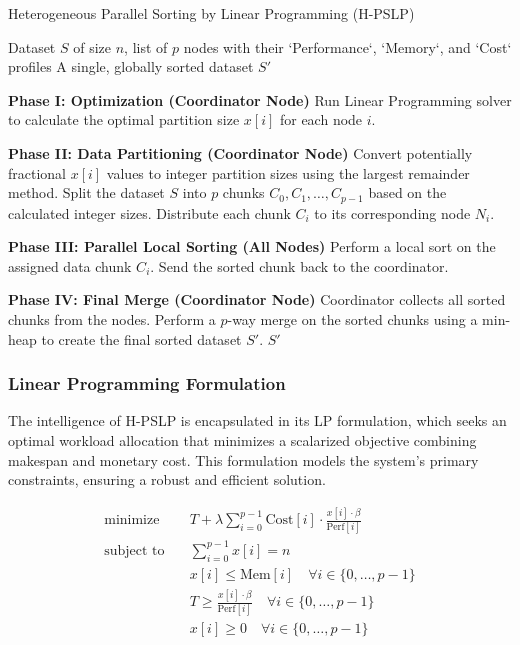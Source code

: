 \documentclass{article}
\begin{document}
\begin{algorithm}[H]
\caption{Heterogeneous Parallel Sorting by Linear Programming (H-PSLP)}
\label{alg:hpslp}
\begin{algorithmic}[1]
\REQUIRE Dataset $S$ of size $n$, list of $p$ nodes with their `Performance`, `Memory`, and `Cost` profiles
\ENSURE A single, globally sorted dataset $S'$

\STATE \textbf{Phase I: Optimization (Coordinator Node)}
\STATE Run Linear Programming solver to calculate the optimal partition size $x[i]$ for each node $i$.

\STATE \textbf{Phase II: Data Partitioning (Coordinator Node)}
\STATE Convert potentially fractional $x[i]$ values to integer partition sizes using the largest remainder method.
\STATE Split the dataset $S$ into $p$ chunks $C_0, C_1, \dots, C_{p-1}$ based on the calculated integer sizes.
\STATE Distribute each chunk $C_i$ to its corresponding node $N_i$.

\STATE \textbf{Phase III: Parallel Local Sorting (All Nodes)}
    \STATE Perform a local sort on the assigned data chunk $C_i$.
    \STATE Send the sorted chunk back to the coordinator.
\ENDFOR

\STATE \textbf{Phase IV: Final Merge (Coordinator Node)}
\STATE Coordinator collects all sorted chunks from the nodes.
\STATE Perform a $p$-way merge on the sorted chunks using a min-heap to create the final sorted dataset $S'$.
\RETURN $S'$
\end{algorithmic}
\end{algorithm}

\subsubsection{Linear Programming Formulation}
\label{sec:lp_formulation}

The intelligence of H-PSLP is encapsulated in its LP formulation, which seeks an optimal workload allocation that minimizes a scalarized objective combining makespan and monetary cost. This formulation models the system's primary constraints, ensuring a robust and efficient solution.

\begin{align}
\text{minimize} \quad & T + \lambda \sum_{i=0}^{p-1} \text{Cost}[i] \cdot \frac{x[i] \cdot \beta}{\text{Perf}[i]} \label{eq:objective}\\
\text{subject to} \quad & \sum_{i=0}^{p-1} x[i] = n \label{eq:workload_constraint}\\
& x[i] \leq \text{Mem}[i] \quad \forall i \in \{0, \ldots, p-1\} \label{eq:memory_constraint}\\
& T \geq \frac{x[i] \cdot \beta}{\text{Perf}[i]} \quad \forall i \in \{0, \ldots, p-1\} \label{eq:makespan_constraint}\\
& x[i] \geq 0 \quad \forall i \in \{0, \ldots, p-1\} \label{eq:non_negative}
\end{align}
\end{document}
